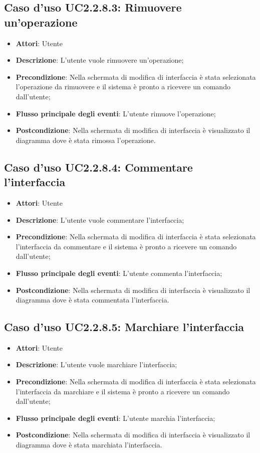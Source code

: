 \documentclass[../AnalisiDeiRequisiti.tex]{subfiles}
\begin{document}
			\subsection{Caso d'uso UC2.2.8.3: Rimuovere un'operazione}
			\begin{itemize}
				\item \textbf{Attori}: Utente
				\item \textbf{Descrizione}: L'utente vuole rimuovere un'operazione;
				\item \textbf{Precondizione}: Nella schermata di modifica di interfaccia è stata selezionata l'operazione da rimuovere e il sistema è pronto a ricevere un comando dall'utente;
				\item \textbf{Flusso principale degli eventi}: L'utente rimuove l'operazione;
				\item \textbf{Postcondizione}: Nella schermata di modifica di interfaccia è visualizzato il diagramma dove è stata rimossa l'operazione.
			\end{itemize}
			\subsection{Caso d'uso UC2.2.8.4: Commentare l'interfaccia}
			\begin{itemize}
				\item \textbf{Attori}: Utente
				\item \textbf{Descrizione}: L'utente vuole commentare l'interfaccia;
				\item \textbf{Precondizione}: Nella schermata di modifica di interfaccia è stata selezionata l'interfaccia da commentare e il sistema è pronto a ricevere un comando dall'utente;
				\item \textbf{Flusso principale degli eventi}: L'utente commenta l'interfaccia;
				\item \textbf{Postcondizione}: Nella schermata di modifica di interfaccia è visualizzato il diagramma dove è stata commentata l'interfaccia.
			\end{itemize}
			\subsection{Caso d'uso UC2.2.8.5: Marchiare l'interfaccia}
			\begin{itemize}
				\item \textbf{Attori}: Utente
				\item \textbf{Descrizione}: L'utente vuole marchiare l'interfaccia;
				\item \textbf{Precondizione}: Nella schermata di modifica di interfaccia è stata selezionata l'interfaccia da marchiare e il sistema è pronto a ricevere un comando dall'utente;
				\item \textbf{Flusso principale degli eventi}: L'utente marchia l'interfaccia;
				\item \textbf{Postcondizione}: Nella schermata di modifica di interfaccia è visualizzato il diagramma dove è stata marchiata l'interfaccia.
			\end{itemize}
\end{document}
